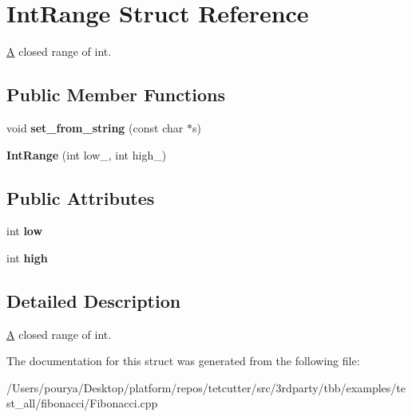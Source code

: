 \hypertarget{structIntRange}{}\section{Int\+Range Struct Reference}
\label{structIntRange}


\hyperlink{structA}{A} closed range of int.  


\subsection*{Public Member Functions}
\begin{DoxyCompactItemize}
\item 
\hypertarget{structIntRange_ae96e8f1d411b6860e892c90cae55b533}{}void {\bfseries set\+\_\+from\+\_\+string} (const char $\ast$s)\label{structIntRange_ae96e8f1d411b6860e892c90cae55b533}

\item 
\hypertarget{structIntRange_aa7e6e74cc63dfc4d731bebb1603465a0}{}{\bfseries Int\+Range} (int low\+\_\+, int high\+\_\+)\label{structIntRange_aa7e6e74cc63dfc4d731bebb1603465a0}

\end{DoxyCompactItemize}
\subsection*{Public Attributes}
\begin{DoxyCompactItemize}
\item 
\hypertarget{structIntRange_acdd4d96d16a09eade74c403a4d25e791}{}int {\bfseries low}\label{structIntRange_acdd4d96d16a09eade74c403a4d25e791}

\item 
\hypertarget{structIntRange_a65884e42447fd4c57161f363641a4e0d}{}int {\bfseries high}\label{structIntRange_a65884e42447fd4c57161f363641a4e0d}

\end{DoxyCompactItemize}


\subsection{Detailed Description}
\hyperlink{structA}{A} closed range of int. 

The documentation for this struct was generated from the following file\+:\begin{DoxyCompactItemize}
\item 
/\+Users/pourya/\+Desktop/platform/repos/tetcutter/src/3rdparty/tbb/examples/test\+\_\+all/fibonacci/Fibonacci.\+cpp\end{DoxyCompactItemize}
